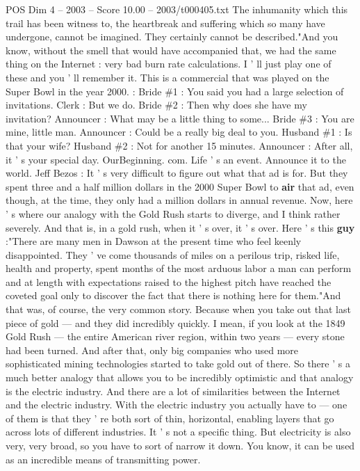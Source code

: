 \begin{textsample}{POS Dim 4 – 2003 – Score 10.00 – 2003/t000405.txt}
The inhumanity which this trail has been witness to, the heartbreak and suffering which so many have undergone, cannot be imagined.
They certainly cannot be described."And you know, without the smell that would have accompanied that, we had the same thing on the Internet : very bad burn rate calculations.
I ' ll just play one of these and you ' ll remember it.
This is a commercial that was played on the Super Bowl in the year 2000. : Bride \#1 : You said you had a large selection of invitations.
Clerk : But we do.
Bride \#2 : Then why does she have my invitation?
Announcer : What may be a little thing to some...
Bride \#3 : You are mine, little man.
Announcer : Could be a really big deal to you.
Husband \#1 : Is that your wife?
Husband \#2 : Not for another 15 minutes.
Announcer : After all, it ' s your special day.
OurBeginning. com.
Life ' s an event.
Announce it to the world.
Jeff Bezos : It ' s very difficult to figure out what that ad is for.
But they spent three and a half million dollars in the 2000 Super Bowl to \textbf{air} that ad, even though, at the time, they only had a million dollars in annual revenue.
Now, here ' s where our analogy with the Gold Rush starts to diverge, and I think rather severely.
And that is, in a gold rush, when it ' s over, it ' s over.
Here ' s this \textbf{guy} :"There are many men in Dawson at the present time who feel keenly disappointed.
They ' ve come thousands of miles on a perilous trip, risked life, health and property, spent months of the most arduous labor a man can perform and at length with expectations raised to the highest pitch have reached the coveted goal only to discover the fact that there is nothing here for them."And that was, of course, the very common story.
Because when you take out that last piece of gold — and they did incredibly quickly.
I mean, if you look at the 1849 Gold Rush — the entire American river region, within two years — every stone had been turned.
And after that, only big companies who used more sophisticated mining technologies started to take gold out of there.
So there ' s a much better analogy that allows you to be incredibly optimistic and that analogy is the electric industry.
And there are a lot of similarities between the Internet and the electric industry.
With the electric industry you actually have to — one of them is that they ' re both sort of thin, horizontal, enabling layers that go across lots of different industries.
It ' s not a specific thing.
But electricity is also very, very broad, so you have to sort of narrow it down.
You know, it can be used as an incredible means of transmitting power.

\end{textsample}
